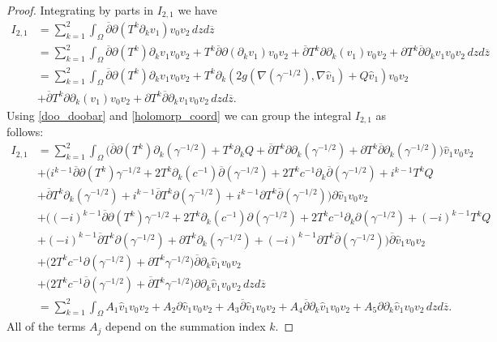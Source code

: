 \documentclass[a4paper, 10pt, twoside, notitlepage]{amsart}
\theoremstyle{plain}
\newcommand{\Om}{\Omega}
\numberwithin{equation}{section}
\newcommand {\p} {\partial}
\newcommand{\dbar}{\ol{\p}}
\newcommand{\ol}[1]{\overline{#1}}
\newcommand{\oz}{\overline{z}}
\begin{document}
\begin{proof}
	Integrating by parts in $I_{2,1}$ we have
	\begin{align*}
		I_{2,1} &= \sum_{k=1}^2 \int_{\Om}\ol{\p}\p(T^k\p_kv_1)v_0v_2\,dzd\oz\\
		&= \sum_{k=1}^2 \int_{\Om}\ol{\p}\p(T^k)\p_kv_1v_0v_2 + T^k\ol{\p}\p(\p_kv_1)v_0v_2 + \ol{\p}T^k\p\p_k(v_1)v_0v_2 + \p T^k\ol{\p}\p_kv_1v_0v_2\,dzd\oz\\
		&=  \sum_{k=1}^2 \int_{\Om}\ol{\p}\p(T^k)\p_kv_1v_0v_2 + T^k\p_k(2g\left(\nabla(\gamma^{-1/2}),\nabla \hat{v}_1\right) + Q\hat{v}_1)v_0v_2\\
		& + \ol{\p}T^k\p\p_k(v_1)v_0v_2 + \p T^k\ol{\p}\p_kv_1v_0v_2\,dzd\oz.
	\end{align*}
	Using \eqref{doo_doobar} and \eqref{holomorp_coord} we can group the integral $I_{2,1}$ as follows:
	\begin{align*}
		I_{2,1}&= \sum_{k=1}^2 \int_{\Om}\Big(\dbar\p(T^k)\p_k(\gamma^{-1/2}) + T^k\p_kQ + \dbar T^k\p\p_k(\gamma^{-1/2}) + \p T^k \dbar\p_k(\gamma^{-1/2})\Big)\hat{v}_1v_0v_2\\
		&+ \Big(i^{k-1}\dbar\p(T^k)\gamma^{-1/2} + 2T^k\p_k(c^{-1})\dbar(\gamma^{-1/2}) + 2T^kc^{-1}\p_k\dbar(\gamma^{-1/2}) + i^{k-1}T^kQ \\
		&+ \dbar T^k\p_k(\gamma^{-1/2}) + i^{k-1}\dbar T^k\p(\gamma^{-1/2}) + i^{k-1}\p T^k\dbar(\gamma^{-1/2})\Big)\p \hat{v}_1v_0v_2\\
		&+\Big((-i)^{k-1}\dbar\p(T^k)\gamma^{-1/2} + 2T^k\p_k(c^{-1})\p(\gamma^{-1/2}) + 2T^kc^{-1}\p_k\p(\gamma^{-1/2}) + (-i)^{k-1}T^kQ \\
		&+ (-i)^{k-1}\dbar T^k\p(\gamma^{-1/2}) + \p T^k\p_k(\gamma^{-1/2}) + (-i)^{k-1}\p T^k \dbar(\gamma^{-1/2})\Big)\dbar \hat{v}_1v_0v_2\\
		&+\Big(2T^kc^{-1}\p(\gamma^{-1/2}) + \p T^k\gamma^{-1/2}\Big)\dbar\p_k \hat{v}_1v_0v_2 \\
		&+ \Big(2T^kc^{-1}\dbar(\gamma^{-1/2}) + \dbar T^k\gamma^{-1/2}\Big)\p\p_k \hat{v}_1v_0v_2\,dzd\oz\\
		&= \sum_{k=1}^2\int_{\Om} A_1\hat{v}_1v_0v_2 + A_2\p \hat{v}_1v_0v_2 + A_3\dbar \hat{v}_1v_0v_2 + A_4\dbar\p_k \hat{v}_1v_0v_2 + A_5\p\p_k \hat{v}_1v_0v_2\,dzd\oz.
	\end{align*}
    All of the terms $A_j$ depend on the summation index $k$.
	

\end{proof}
\end{document}
